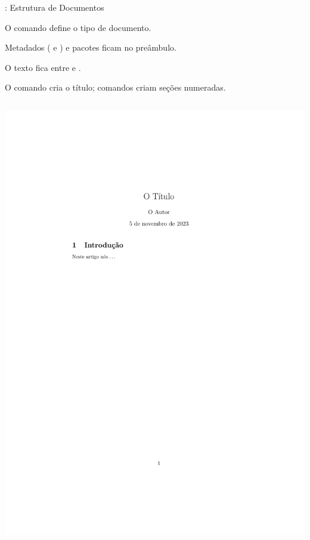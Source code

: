 \documentclass{beamer}
\begin{document}
\begin{frame}[fragile]{\insertsection: Estrutura de Documentos}
\begin{itemize}{\small
  \item O comando  define o tipo de documento.
  \item Metadados ( e ) e pacotes ficam no preâmbulo.
  \item O texto fica entre  e .
  \item O comando  cria o título; comandos  criam seções numeradas.
}\end{itemize}
\begin{minipage}{0.55\linewidth}
  \inputminted[fontsize=\scriptsize,frame=single,resetmargins]{latex}{recap-structure.tex}
\end{minipage}
\begin{minipage}{0.35\linewidth}
  \includegraphics[width=\textwidth,clip,trim=1.5in 7in 3in 2in]{recap-structure.pdf} %
\end{minipage}
\end{frame}
\end{document}
